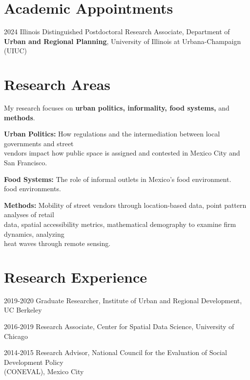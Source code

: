 \documentclass[12pt,letterpaper]{report}
\newcommand{\listitemspace}{0.25em}
\renewenvironment{itemize}
{\begin{list}{}{\setlength{\leftmargin}{0em}
                \setlength{\parskip}{0em}
                \setlength{\itemsep}{\listitemspace}
                \setlength{\parsep}{\listitemspace}}}
{\end{list}}
\begin{document}
    \section*{Academic Appointments}
    \begin{tablist}
       \item[2024] \quad{} Illinois Distinguished Postdoctoral Research Associate, Department of \textbf{Urban and Regional Planning}, University of Illinois at Urbana-Champaign (UIUC)
       \end{tablist}


    
    \section*{Research Areas}
    \begin{itemize}
\item My research focuses on \textbf{urban politics, informality, food systems,} and \textbf{methods}.

\subitem \textbf{Urban Politics:} How regulations and the intermediation between local governments and street \\
\hspace{1.5em} vendors impact how public space is assigned and contested in Mexico City and San Francisco.

\subitem \textbf{Food Systems:} The role of informal outlets in Mexico's food environment. \\
\hspace{1.5em} food environments.

\subitem \textbf{Methods:}  Mobility of street vendors through location-based data, point pattern analyses of retail\\
\hspace{1.5em} data, spatial accessibility metrics,  mathematical demography to examine firm dynamics, analyzing \\
\hspace{1.5em} heat waves through remote sensing. 
    \end{itemize}
    
    \section*{Research Experience}
    \begin{tablist}
        \item[2019‐2020] \quad{}Graduate Researcher, Institute of Urban and Regional Development, UC Berkeley
        \item[2016‐2019] \quad{}Research Associate, Center for Spatial Data Science, University of Chicago
        \item[2014‐2015] \quad{}Research Advisor, National Council for the Evaluation of Social Development Policy \\
        \hspace{1em}(CONEVAL), Mexico City
    \end{tablist}
\end{document}
